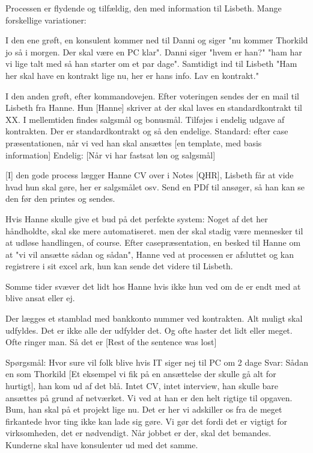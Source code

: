 \begin{linenumbers*}
Processen er flydende og tilfældig, den med information til Lisbeth. 
Mange forskellige variationer:

I den ene grøft, en konsulent kommer ned til Danni og siger "nu kommer Thorkild jo så i morgen. Der skal være en PC klar". Danni siger "hvem er han?" "ham har vi lige talt med så han starter om et par dage".
Samtidigt ind til Lisbeth "Ham her skal have en kontrakt lige nu, her er hans info. Lav en kontrakt."

I den anden grøft, efter kommandovejen. Efter voteringen sendes der en mail til Lisbeth fra Hanne. Hun [Hanne] skriver at der skal laves en standardkontrakt til XX. I mellemtiden findes salgsmål og bonusmål. Tilføjes i endelig udgave af kontrakten.
Der er standardkontrakt og så den endelige. 
Standard: efter case præsentationen, når vi ved han skal ansættes [en template, med basis information]
Endelig: [Når vi har fastsat løn og salgsmål]

[I] den gode process lægger Hanne CV over i Notes [QHR], Lisbeth får at vide hvad hun skal gøre, her er salgsmålet osv. Send en PDf til ansøger, så han kan se den før den printes og sendes.

Hvis Hanne skulle give et bud på det perfekte system:
Noget af det her håndholdte, skal ske mere automatiseret. men der skal stadig være mennesker til at udløse handlingen, of course. 
Efter casepræsentation, en besked til Hanne om at "vi vil ansætte sådan og sådan", Hanne ved at processen er afsluttet og kan registrere i sit excel ark, hun kan sende det videre til Lisbeth.

Somme tider svæver det lidt hos Hanne hvis ikke hun ved om de er endt med at blive ansat eller ej.

Der lægges et stamblad med bankkonto nummer ved kontrakten. Alt muligt skal udfyldes. Det er ikke alle der udfylder det. Og ofte haster det lidt eller meget. Ofte ringer man. Så det er [Rest of the sentence was lost]




Spørgsmål:
Hvor sure vil folk blive hvis IT siger nej til PC om 2 dage
Svar:
Sådan en som Thorkild [Et eksempel vi fik på en ansættelse der skulle gå alt for hurtigt], han kom ud af det blå.  Intet CV, intet interview, han skulle bare ansættes på grund af netværket. Vi ved at han er den helt rigtige til opgaven. Bum, han skal på et projekt lige nu.
Det er her vi adskiller os fra de meget firkantede hvor ting ikke kan lade sig gøre. 
Vi gør det fordi det er vigtigt for virksomheden, det er nødvendigt. Når jobbet er der, skal det bemandes.
Kunderne skal have konsulenter ud med det samme.


\end{linenumbers*}
